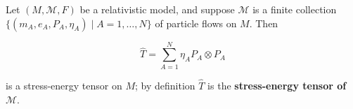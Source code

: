 Let $(M, \mathcal{M}, F)$ be a relativistic model, and suppose $\mathcal{M}$ is a finite collection $\{(m_A, e_A, P_A, \eta_A) \mid A = 1, \ldots, N\}$ of particle flows on $M$. Then

$$\hat{T} = \sum_{A=1}^{N} \eta_A P_A \otimes P_A$$

is a stress-energy tensor on $M$; by definition $\hat{T}$ is the \textbf{stress-energy tensor of $\mathcal{M}$}.
